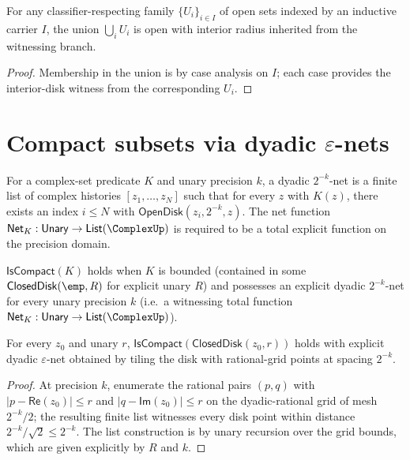 \begin{theorem}
\label{thm:cplx-topo-union}
For any classifier-respecting family \(\{U_i\}_{i \in I}\) of open sets indexed by an inductive carrier \(I\), the union \(\bigcup_i U_i\) is open with interior radius inherited from the witnessing branch.
\end{theorem}
\begin{proof}
Membership in the union is by case analysis on \(I\); each case provides the interior-disk witness from the corresponding \(U_i\).
\end{proof}

\section{Compact subsets via dyadic \(\varepsilon\)-nets}
\label{sec:cplx-topo-compact}

\begin{definition}
\label{def:cplx-topo-dyadic-net}
For a complex-set predicate \(K\) and unary precision \(k\), a dyadic \(2^{-k}\)-net is a finite list of complex histories \([z_1, \ldots, z_N]\) such that for every \(z\) with \(K(z)\), there exists an index \(i \leq N\) with \(\mathsf{OpenDisk}(z_i, 2^{-k}, z)\). The net function \(\mathsf{Net}_K : \mathsf{Unary} \to \mathsf{List}(\ComplexUp)\) is required to be a total explicit function on the precision domain.
\end{definition}

\begin{definition}
\label{def:cplx-topo-compact}
\(\mathsf{IsCompact}(K)\) holds when \(K\) is bounded (contained in some \(\mathsf{ClosedDisk}(\emp, R)\) for explicit unary \(R\)) and possesses an explicit dyadic \(2^{-k}\)-net for every unary precision \(k\) (i.e.\ a witnessing total function \(\mathsf{Net}_K : \mathsf{Unary} \to \mathsf{List}(\ComplexUp)\)).
\end{definition}

\begin{theorem}
\label{thm:cplx-topo-closed-disk-compact}
For every \(z_0\) and unary \(r\), \(\mathsf{IsCompact}(\mathsf{ClosedDisk}(z_0, r))\) holds with explicit dyadic \(\varepsilon\)-net obtained by tiling the disk with rational-grid points at spacing \(2^{-k}\).
\end{theorem}
\begin{proof}
At precision \(k\), enumerate the rational pairs \((p, q)\) with \(|p - \mathsf{Re}(z_0)| \leq r\) and \(|q - \mathsf{Im}(z_0)| \leq r\) on the dyadic-rational grid of mesh \(2^{-k}/2\); the resulting finite list witnesses every disk point within distance \(2^{-k}/\sqrt{2} \leq 2^{-k}\). The list construction is by unary recursion over the grid bounds, which are given explicitly by \(R\) and \(k\).
\end{proof}

